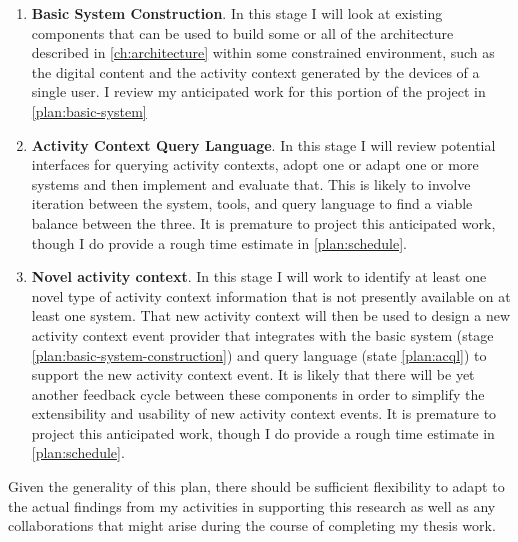 \begin{enumerate}
    \item \label{plan:basic-system-construction}\textbf{Basic System Construction}.  In this stage I will look at
          existing components that can be used to build some or all of the
          architecture described in \autoref{ch:architecture} within some constrained
          environment, such as the digital content and the activity context generated
          by the devices of a single user.  I review my anticipated work for
          this portion of the project in \autoref{plan:basic-system}

    \item \label{plan:acql}\textbf{Activity Context Query Language}.  In this stage I will review
          potential interfaces for querying activity contexts, adopt one or adapt one
          or more systems and then implement and evaluate that.  This is likely to
          involve iteration between the system, tools, and query language to find a
          viable balance between the three. It is premature to project this
          anticipated work, though I do provide a rough time estimate in
          \autoref{plan:schedule}.

    \item \label{plan:new-activity}\textbf{Novel activity context}.  In this
          stage I will work to identify at least one novel type of activity context
          information that is not presently available on at least one system.  That
          new activity context will then be used to design a new activity context
          event provider that integrates with the basic system (stage
          \ref{plan:basic-system-construction}) and query language (state
          \ref{plan:acql}) to support the new activity context event.  It is likely
          that there will be yet another feedback cycle between these components in
          order to simplify the extensibility and usability of new activity context
          events. It is premature to project this anticipated work, though I do
          provide a rough time estimate in \autoref{plan:schedule}.

\end{enumerate}

Given the generality of this plan, there should be sufficient flexibility to
adapt to the actual findings from my activities in supporting this research as
well as any collaborations that might arise during the course of completing my
thesis work.

